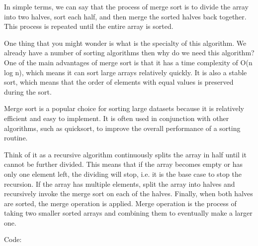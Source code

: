        In simple terms, we can say that the process of merge sort is to divide the array into two halves, sort each half, and then merge the sorted halves back together. This process is repeated until the entire array is sorted.
        
        One thing that you might wonder is what is the specialty of this algorithm. We already have a number of sorting algorithms then why do we need this algorithm? One of the main advantages of merge sort is that it has a time complexity of O(n log n), which means it can sort large arrays relatively quickly. It is also a stable sort, which means that the order of elements with equal values is preserved during the sort.
        
        Merge sort is a popular choice for sorting large datasets because it is relatively efficient and easy to implement. It is often used in conjunction with other algorithms, such as quicksort, to improve the overall performance of a sorting routine.

        Think of it as a recursive algorithm continuously splits the array in half until it cannot be further divided. This means that if the array becomes empty or has only one element left, the dividing will stop, i.e. it is the base case to stop the recursion. If the array has multiple elements, split the array into halves and recursively invoke the merge sort on each of the halves. Finally, when both halves are sorted, the merge operation is applied. Merge operation is the process of taking two smaller sorted arrays and combining them to eventually make a larger one.
                         
\noindent Code:


